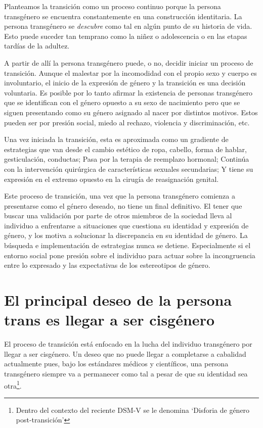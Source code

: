 Planteamos la transición como un proceso continuo porque la persona transgénero
se encuentra constantemente en una construcción identitaria. La persona
transgénero se \emph{descubre} como tal en algún punto de su historia de vida.
Esto puede suceder tan temprano como la niñez o adolescencia o en las etapas
tardías de la adultez.

A partir de allí la persona transgénero puede, o no, decidir iniciar un proceso
de transición. Aunque el malestar por la incomodidad con el propio sexo y cuerpo
es involuntario, el inicio de la expresión de género y la transición es una
decisión voluntaria. Es posible por lo tanto afirmar la existencia de personas
transgénero que se identifican con el género opuesto a su sexo de nacimiento
pero que se siguen presentando como su género asignado al nacer por distintos
motivos. Estos pueden ser por presión social, miedo al rechazo, violencia y
discriminación, etc.

Una vez iniciada la transición, esta es aproximada como un gradiente de
estrategias que van desde el cambio estético de ropa, cabello, forma de hablar,
gesticulación, conductas; Pasa por la terapia de reemplazo hormonal; Continúa
con la intervención quirúrgica de características sexuales secundarias; Y tiene
su expresión en el extremo opuesto en la cirugía de reasignación genital.

Este proceso de transición, una vez que la persona transgénero comienza a
presentarse como el género deseado, no tiene un final definitivo. El tener que
buscar una validación por parte de otros miembros de la sociedad lleva al
individuo a enfrentarse a situaciones que cuestiona su identidad y expresión de
género, y los motiva a solucionar la discrepancia en su identidad de género. La
búsqueda e implementación de estrategias nunca se detiene. Especialmente si el
entorno social pone presión sobre el individuo para actuar sobre la
incongruencia entre lo expresado y las expectativas de los estereotipos de
género.

\section{El principal deseo de la persona trans es llegar a ser cisgénero}

El proceso de transición está enfocado en la lucha del individuo
transgénero por llegar a ser cisgénero. Un deseo que no puede llegar a
completarse a cabalidad actualmente pues, bajo los estándares médicos y
científicos, una persona transgénero siempre va a permanecer como tal a pesar de
que su identidad sea otra\footnote{Dentro del contexto del reciente DSM-V se le
denomina ‘Disforia de género post-transición’}.

